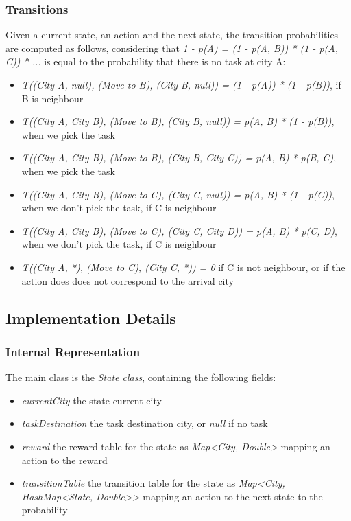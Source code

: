 \documentclass[11pt]{article}
\begin{document}
\subsubsection{Transitions}
Given a current state, an action and the next state, the transition probabilities are computed as follows, considering that \textit{1 - p(A) = (1 - p(A, B)) * (1 - p(A, C)) * ...} is equal to the probability that there is no task at city A:
\begin{itemize}
	\item \textit{T((City A, null), (Move to B), (City B, null)) = (1 - p(A)) * (1 - p(B))}, if B is neighbour
	\item \textit{T((City A, City B), (Move to B), (City B, null)) = p(A, B) * (1 - p(B))}, when we pick the task
	\item \textit{T((City A, City B), (Move to B), (City B, City C)) = p(A, B) * p(B, C)}, when we pick the task
	\item \textit{T((City A, City B), (Move to C), (City C, null)) = p(A, B) * (1 - p(C))}, when we don't pick the task, if C is neighbour
	\item \textit{T((City A, City B), (Move to C), (City C, City D)) = p(A, B) * p(C, D)}, when we don't pick the task, if C is neighbour
	\item \textit{T((City A, *), (Move to C), (City C, *)) = 0} if C is not neighbour, or if the action does does not correspond to the arrival city
\end{itemize}

\subsection{Implementation Details}
\subsubsection{Internal Representation}
The main class is the \textit{State class}, containing the following fields: 
\begin{itemize}
	\item \textit{currentCity} the state current city
	\item \textit{taskDestination} the task destination city, or \textit{null} if no task
	\item \textit{reward} the reward table for the state as \textit{Map<City, Double>} mapping an action to the reward
	\item \textit{transitionTable} the transition table for the state as \textit{Map<City, HashMap<State, Double>>} mapping an action to the next state to the probability
\end{itemize}
\end{document}
